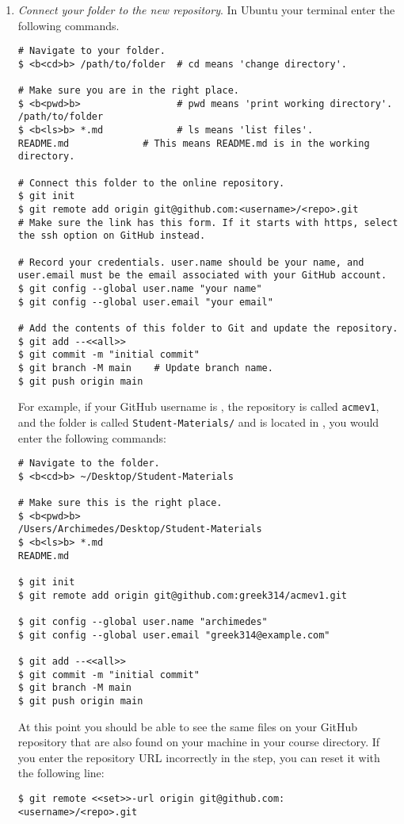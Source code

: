 \begin{enumerate}
    \item \emph{Connect your folder to the new repository}.
    \label{step:connect-folder}
    In 
    \ifwindows
    Ubuntu
    \else
    your terminal
    \fi 
    enter the following commands.
\begin{lstlisting}
# Navigate to your folder.
$ <b<cd>b> /path/to/folder  # cd means 'change directory'.

# Make sure you are in the right place.
$ <b<pwd>b>                 # pwd means 'print working directory'.
/path/to/folder
$ <b<ls>b> *.md             # ls means 'list files'.
README.md             # This means README.md is in the working directory.

# Connect this folder to the online repository.
$ git init
$ git remote add origin git@github.com:<username>/<repo>.git
# Make sure the link has this form. If it starts with https, select the ssh option on GitHub instead.

# Record your credentials. user.name should be your name, and user.email must be the email associated with your GitHub account.
$ git config --global user.name "your name"
$ git config --global user.email "your email"

# Add the contents of this folder to Git and update the repository.
$ git add --<<all>>
$ git commit -m "initial commit"
$ git branch -M main    # Update branch name.
$ git push origin main
\end{lstlisting}
    
    For example, if your GitHub username is , the repository is called \texttt{acmev1}, and the folder is called \texttt{Student-Materials/} and is located in , you would enter the following commands:
\begin{lstlisting}
# Navigate to the folder.
$ <b<cd>b> ~/Desktop/Student-Materials

# Make sure this is the right place.
$ <b<pwd>b>
/Users/Archimedes/Desktop/Student-Materials
$ <b<ls>b> *.md
README.md

$ git init
$ git remote add origin git@github.com:greek314/acmev1.git

$ git config --global user.name "archimedes"
$ git config --global user.email "greek314@example.com"

$ git add --<<all>>
$ git commit -m "initial commit"
$ git branch -M main
$ git push origin main
\end{lstlisting}
    
    At this point you should be able to see the same files on your GitHub repository that are also found on your machine in your course directory.
    If you enter the repository URL incorrectly in the  step, you can reset it with the following line:
\begin{lstlisting}
$ git remote <<set>>-url origin git@github.com:<username>/<repo>.git
\end{lstlisting}


\end{enumerate}
